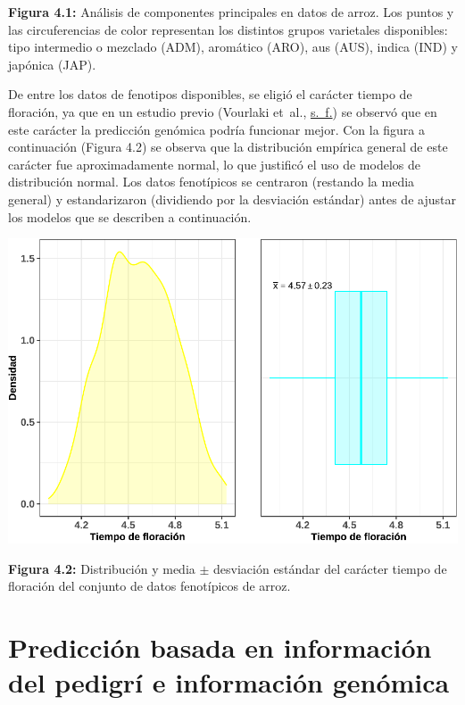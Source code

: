 \documentclass[11pt,spanish,a4paper,oneside,]{book} %
\begin{document}
\noindent 
\textbf{Figura 4.1:} Análisis de componentes principales en datos de arroz. Los puntos y las circuferencias de color representan los distintos grupos varietales disponibles: tipo intermedio o mezclado (ADM), aromático (ARO), aus (AUS), indica (IND) y japónica (JAP).

\hspace*{1em}

De entre los datos de fenotipos disponibles, se eligió el carácter tiempo de floración, ya que en un estudio previo (Vourlaki et~al., \protect\hyperlink{ref-cite:26}{s.~f.}) se observó que en este carácter la predicción genómica podría funcionar mejor. Con la figura a continuación (Figura 4.2) se observa que la distribución empírica general de este carácter fue aproximadamente normal, lo que justificó el uso de modelos de distribución normal. Los datos fenotípicos se centraron (restando la media general) y estandarizaron (dividiendo por la desviación estándar) antes de ajustar los modelos que se describen a continuación.

\begin{center}\includegraphics[width=1\linewidth]{figures/Graf_feno_2} \end{center}

\noindent
\textbf{Figura 4.2:} Distribución y media \(\pm\) desviación estándar del carácter tiempo de floración del conjunto de datos fenotípicos de arroz.

\hypertarget{predicciuxf3n-basada-en-informaciuxf3n-del-pedigruxed-e-informaciuxf3n-genuxf3mica}{%
\section{Predicción basada en información del pedigrí e información genómica}\label{predicciuxf3n-basada-en-informaciuxf3n-del-pedigruxed-e-informaciuxf3n-genuxf3mica}}
\end{document}

